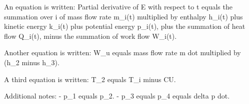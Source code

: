 An equation is written:  
Partial derivative of E with respect to t equals the summation over i of mass flow rate m_i(t) multiplied by enthalpy h_i(t) plus kinetic energy k_i(t) plus potential energy p_i(t), plus the summation of heat flow Q_i(t), minus the summation of work flow W_i(t).  

Another equation is written:  
W_u equals mass flow rate m dot multiplied by (h_2 minus h_3).  

A third equation is written:  
T_2 equals T_i minus CU.  

Additional notes:  
- p_1 equals p_2.  
- p_3 equals p_4 equals delta p dot.